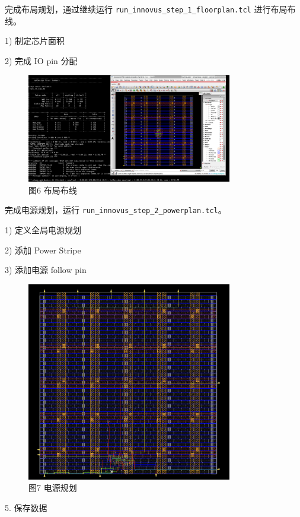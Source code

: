 完成布局规划，通过继续运行 \texttt{run\_innovus\_step\_1\_floorplan.tcl} 进行布局布线。

1) 制定芯片面积

2) 完成 IO pin 分配

\begin{figure}[H]
    \centering
    \includegraphics[width=0.8\textwidth]{images/final-task03-05.png}
    \caption{图6 布局布线}
\end{figure}

完成电源规划，运行 \texttt{run\_innovus\_step\_2\_powerplan.tcl}。

1) 定义全局电源规划

2) 添加 Power Stripe
    
3) 添加电源 follow pin

\begin{figure}[H]
    \centering
    \includegraphics[width=0.8\textwidth]{images/final-task03-08.png}
    \caption{图7 电源规划}
\end{figure}

5. 保存数据

